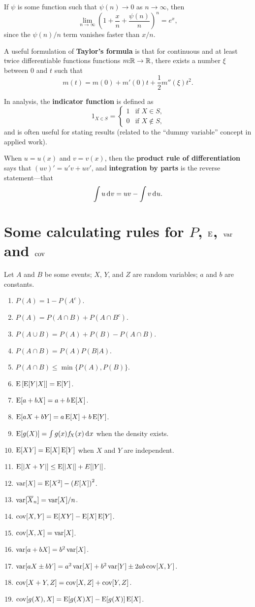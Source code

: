 \documentclass[10pt]{article}
\begin{document}
If $\psi$ is some function such that $\psi(n) \rightarrow 0$ as $n\rightarrow\infty$,
then \[ \lim_{n\rightarrow\infty} \left(1 + \frac{x}{n} + \frac{\psi(n)}{n}  \right)^n = e^x,\]
since the $\psi(n)/n$ term vanishes faster than $x/n$.

A useful formulation of \textbf{Taylor's formula} is that for continuous and at
least twice differentiable functions functions $m\!\!:\!\!\mathbb{R} \rightarrow \mathbb{R}$, there
exists a number $\xi$ between $0$ and $t$ such that \[ m(t) = m(0) + m'(0) t +
\frac{1}{2} m''(\xi) t^2.\]

In analysis, the \textbf{indicator function} is defined as 
\[ 1_{X\in S} = \begin{cases} 1 & \text{if $X\in S$,} \\ 0 & \text{if $X\notin S$,}\end{cases}\]
and is often useful for stating results (related to the ``dummy variable'' concept in applied work).

When $u=u(x)$ and $v=v(x)$, then the \textbf{product rule of differentiation}
says that $(u v)' = u'v + u v'$,  and \textbf{integration by parts} is the reverse statement---that
\[\int u \rd v = u v - \int v \rd u. \]

\section{Some calculating rules for $P$, $\operatorname{E}$, $\operatorname{var}$ and $\operatorname{cov}$}
Let $A$ and $B$ be some events; $X$, $Y$, and $Z$ are random variables; $a$ and $b$
are constants.
\begin{enumerate}
\item $P(A) = 1 - P(A^c)$.
\item $P(A) = P(A\cap B) + P(A\cap B^c)$.
\item $P(A\cup B) = P(A) + P(B) - P(A\cap B)$.
\item $P(A \cap B) = P(A)P(B|A)$.
\item $P(A\cap B) \leq \min\{P(A), P(B)\}$.
\item $\operatorname{E}\left[\operatorname{E}[Y|X]\right] = \operatorname{E}[Y]$.
\item $\operatorname{E}[a + bX ] = a + b\operatorname{E}[X]$.
\item $\operatorname{E}[a X + b Y] = a\operatorname{E}[X] + b\operatorname{E}[Y]$.
\item $\E[g(X)] = \int g(x) f_{\!X}(x) \rd x$ when the density exists.
\item $\operatorname{E}[XY] = \operatorname{E}[X]\operatorname{E}[Y]$ when $X$ and $Y$ are independent.
\item $\operatorname{E}[|X+Y|] \leq \operatorname{E}[|X|] + E[|Y|]$.
\item $\operatorname{var}[X] = \operatorname{E}[X^2] - \left(E[X]\right)^2$.
\item $\operatorname{var}[\overline{X}_n] = \operatorname{var}[X] / n$. 
\item $\operatorname{cov}[X,Y] = \operatorname{E}[XY] - \operatorname{E}[X]\operatorname{E}[Y]$.
\item $\operatorname{cov}[X,X] = \operatorname{var}[X]$.
\item $\operatorname{var}[a + bX] = b^2 \operatorname{var}[X]$.
\item $\operatorname{var}[a X \pm b Y] = a^2 \operatorname{var}[X] + b^2 \operatorname{var}[Y] \pm 2 a b \operatorname{cov}[X,Y]$.
\item $\operatorname{cov}[X+Y,Z] =  \operatorname{cov}[X,Z] + \operatorname{cov}[Y,Z]$.
\item $\operatorname{cov}[g(X),X] = \operatorname{E}[g(X)X]  - \operatorname{E}[g(X)]\operatorname{E}[X]$.
\end{enumerate}
\end{document}
